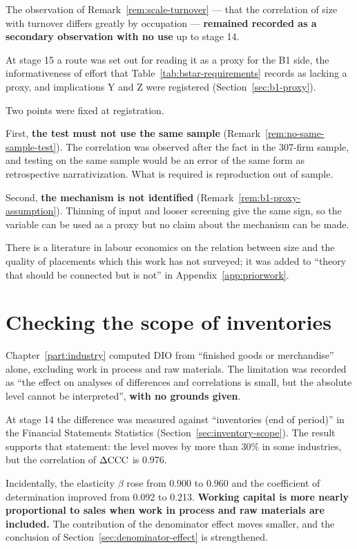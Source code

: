 The observation of Remark~\ref{rem:scale-turnover} — that the correlation of size with turnover
differs greatly by occupation — \textbf{remained recorded as a secondary observation with no use}
up to stage 14.

At stage 15 a route was set out for reading it as a proxy for the B1 side, the informativeness of
effort that Table~\ref{tab:bstar-requirements} records as lacking a proxy, and implications Y and Z
were registered (Section~\ref{sec:b1-proxy}).

Two points were fixed at registration.

First, \textbf{the test must not use the same sample}
(Remark~\ref{rem:no-same-sample-test}). The correlation was observed after the fact in the 307-firm
sample, and testing on the same sample would be an error of the same form as retrospective
narrativization. What is required is reproduction out of sample.

Second, \textbf{the mechanism is not identified}
(Remark~\ref{rem:b1-proxy-assumption}). Thinning of input and looser screening give the same sign,
so the variable can be used as a proxy but no claim about the mechanism can be made.

There is a literature in labour economics on the relation between size and the quality of
placements which this work has not surveyed; it was added to ``theory that should be connected but
is not'' in Appendix~\ref{app:priorwork}.

\section{Checking the scope of inventories}

Chapter~\ref{part:industry} computed $\mathrm{DIO}$ from ``finished goods or merchandise'' alone,
excluding work in process and raw materials. The limitation was recorded as ``the effect on
analyses of differences and correlations is small, but the absolute level cannot be interpreted'',
\textbf{with no grounds given}.

At stage 14 the difference was measured against ``inventories (end of period)'' in the Financial
Statements Statistics (Section~\ref{sec:inventory-scope}). The result supports that statement: the
level moves by more than 30\% in some industries, but the correlation of $\Delta\mathrm{CCC}$ is 0.976.

Incidentally, the elasticity $\beta$ rose from 0.900 to 0.960 and the coefficient of determination
improved from 0.092 to 0.213. \textbf{Working capital is more nearly proportional to sales when
work in process and raw materials are included.} The contribution of the denominator effect moves
smaller, and the conclusion of Section~\ref{sec:denominator-effect} is strengthened.

